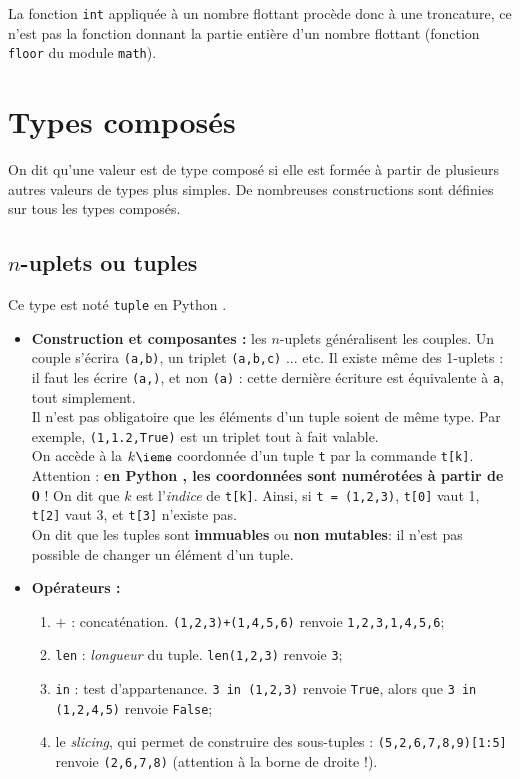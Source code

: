 La fonction \texttt{int} appliquée à un nombre flottant procède donc à une troncature, ce n'est pas la fonction donnant la partie entière d'un nombre flottant (fonction \texttt{floor} du module \texttt{math}).

\section{Types composés}
\begin{defi}
On dit qu'une valeur est de type composé si elle est formée à partir de plusieurs autres 
valeurs de types plus simples. De nombreuses constructions sont définies sur tous les types 
composés.
\end{defi}

\subsection{$n$-uplets ou tuples}

\begin{defi}[tuple]
Ce type est noté \texttt{tuple} en Python .
\begin{itemize}
\item \textbf{Construction et composantes :} les $n$-uplets généralisent les couples. Un couple s'écrira \texttt{(a,b)}, un triplet 
\texttt{(a,b,c)} ... etc. Il existe même des 1-uplets : il faut les écrire \texttt{(a,)}, et non 
\texttt{(a)} : cette dernière écriture est équivalente à \texttt{a}, tout simplement.\\
Il n'est pas obligatoire que les éléments d'un tuple soient de même type. Par exemple, 
\texttt{(1,1.2,True)} est un triplet tout à fait valable.\\
On accède à la $k\ieme$ coordonnée d'un tuple \texttt{t} par la commande \texttt{t[k]}. Attention : 
\textbf{en Python , les coordonnées sont numérotées à partir de 0} ! On dit que $k$ est 
l'\emph{indice} de \texttt{t[k]}. Ainsi, si \texttt{t = (1,2,3)}, \texttt{t[0]} vaut 1, 
\texttt{t[2]} vaut 3, et \texttt{t[3]} n'existe pas.\\
On dit que les tuples sont \textbf{immuables} ou \textbf{non mutables}: il n'est pas possible de changer un élément d'un 
tuple.
\item \textbf{Opérateurs :}
\begin{enumerate}
 \item $+$ : concaténation. \texttt{(1,2,3)+(1,4,5,6)} renvoie \texttt{1,2,3,1,4,5,6};
 \item \texttt{len} : \emph{longueur} du tuple. \texttt{len(1,2,3)} renvoie \texttt{3};
 \item \texttt{in} : test d'appartenance. \texttt{3 in (1,2,3)} renvoie \texttt{True}, alors que 
\texttt{3 in (1,2,4,5)} renvoie \texttt{False};
\item le \emph{slicing}, qui permet de construire des sous-tuples : \texttt{(5,2,6,7,8,9)[1:5]} 
renvoie \texttt{(2,6,7,8)} (attention à la borne de droite !).\\
\end{enumerate}
\end{itemize}
\end{defi}


